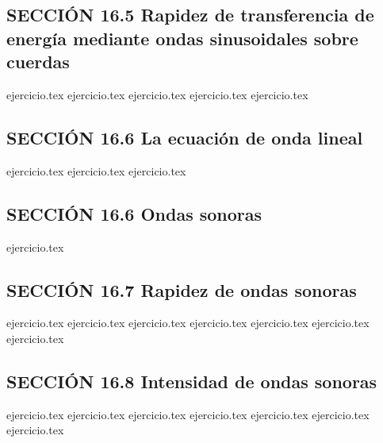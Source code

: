 \subsection*{SECCIÓN 16.5 Rapidez de transferencia de energía mediante ondas sinusoidales sobre cuerdas}
\begin{enumerate}
    \setcounter{enumi}{14}
    {ejercicio.tex}
    {ejercicio.tex}
    {ejercicio.tex}
    {ejercicio.tex}
    {ejercicio.tex}
\end{enumerate}

\subsection*{SECCIÓN 16.6 La ecuación de onda lineal}
\begin{enumerate}
    \setcounter{enumi}{19}
    {ejercicio.tex}
    {ejercicio.tex}
    {ejercicio.tex}
\end{enumerate}

\subsection*{SECCIÓN 16.6 Ondas sonoras}
\begin{enumerate}
    \setcounter{enumi}{22}
    {ejercicio.tex}
\end{enumerate}

\subsection*{SECCIÓN 16.7 Rapidez de ondas sonoras}
\begin{enumerate}
    \setcounter{enumi}{23}
    {ejercicio.tex}
    {ejercicio.tex}
    {ejercicio.tex}
    {ejercicio.tex}
    {ejercicio.tex}
    {ejercicio.tex}
    {ejercicio.tex}
\end{enumerate}

\subsection*{SECCIÓN 16.8 Intensidad de ondas sonoras}
\begin{enumerate}
    \setcounter{enumi}{30}
    {ejercicio.tex}
    {ejercicio.tex}
    {ejercicio.tex}
    {ejercicio.tex}
    {ejercicio.tex}
    {ejercicio.tex}
    {ejercicio.tex}
\end{enumerate}


